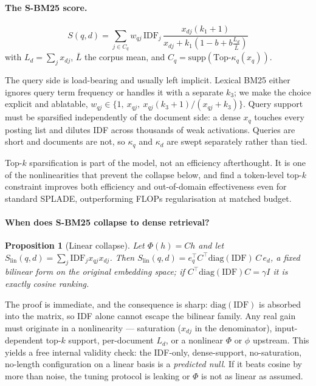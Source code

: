 \documentclass[11pt]{article}
\newtheorem{proposition}{Proposition}
\newcommand{\idf}{\mathrm{IDF}}
\begin{document}
\paragraph{The S-BM25 score.}
\begin{equation}
S(q,d)=\sum_{j\in C_q} w_{qj}\,\idf_j\,\frac{x_{dj}(k_1{+}1)}{x_{dj}+k_1\!\left(1-b+b\frac{L_d}{\bar L}\right)}
\label{eq:sbm25}
\end{equation}
with $L_d=\sum_j x_{dj}$, $\bar L$ the corpus mean, and $C_q=\mathrm{supp}(\text{Top-}\kappa_q(x_q))$.

The query side is load-bearing and usually left implicit. Lexical BM25 either ignores query term frequency or handles it with a separate $k_3$; we make the choice explicit and ablatable, $w_{qj}\in\{1,\ x_{qj},\ x_{qj}(k_3{+}1)/(x_{qj}+k_3)\}$. Query support must be sparsified independently of the document side: a dense $x_q$ touches every posting list and dilutes IDF across thousands of weak activations. Queries are short and documents are not, so $\kappa_q$ and $\kappa_d$ are swept separately rather than tied.

Top-$k$ sparsification is part of the model, not an efficiency afterthought. It is one of the nonlinearities that prevent the collapse below, and \citet{zong2026tokens} find a token-level top-$k$ constraint improves both efficiency and out-of-domain effectiveness even for standard SPLADE, outperforming FLOPs regularisation at matched budget.

\paragraph{When does S-BM25 collapse to dense retrieval?}
\begin{proposition}[Linear collapse]
Let $\Phi(h)=Ch$ and let $S_{\mathrm{lin}}(q,d)=\sum_j \idf_j x_{qj}x_{dj}$. Then $S_{\mathrm{lin}}(q,d)=e_q^{\top}C^{\top}\mathrm{diag}(\idf)\,C\,e_d$, a fixed bilinear form on the original embedding space; if $C^{\top}\mathrm{diag}(\idf)C=\gamma I$ it is exactly cosine ranking.
\end{proposition}
The proof is immediate, and the consequence is sharp: $\mathrm{diag}(\idf)$ is absorbed into the matrix, so IDF alone cannot escape the bilinear family. Any real gain must originate in a nonlinearity --- saturation ($x_{dj}$ in the denominator), input-dependent top-$k$ support, per-document $L_d$, or a nonlinear $\Phi$ or $\phi$ upstream. This yields a free internal validity check: the IDF-only, dense-support, no-saturation, no-length configuration on a linear basis is a \emph{predicted null}. If it beats cosine by more than noise, the tuning protocol is leaking or $\Phi$ is not as linear as assumed.
\end{document}

